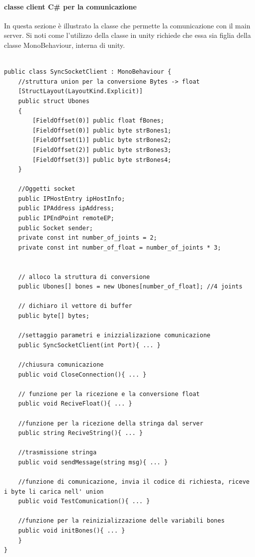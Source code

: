 \documentclass[10pt,a4paper]{article}
\begin{document}
\paragraph{classe client C\# per la comunicazione}
In questa sezione è illustrato la classe che permette la comunicazione con il main server. 
Si noti come l'utilizzo della classe in unity richiede che essa sia figlia della classe MonoBehaviour, interna di unity.
\begin{lstlisting}[style=mycsharp, caption=class client C\#, captionpos=b]

public class SyncSocketClient : MonoBehaviour {
    //struttura union per la conversione Bytes -> float
    [StructLayout(LayoutKind.Explicit)]
    public struct Ubones
    {
        [FieldOffset(0)] public float fBones;
        [FieldOffset(0)] public byte strBones1;
        [FieldOffset(1)] public byte strBones2;
        [FieldOffset(2)] public byte strBones3;
        [FieldOffset(3)] public byte strBones4;
    }

    //Oggetti socket 
    public IPHostEntry ipHostInfo;
    public IPAddress ipAddress;
    public IPEndPoint remoteEP;
    public Socket sender;
    private const int number_of_joints = 2;
    private const int number_of_float = number_of_joints * 3;


    // alloco la struttura di conversione
    public Ubones[] bones = new Ubones[number_of_float]; //4 joints

    // dichiaro il vettore di buffer
    public byte[] bytes;

    //settaggio parametri e inizzializazione comunicazione
    public SyncSocketClient(int Port){ ... }

    //chiusura comunicazione
    public void CloseConnection(){ ... }

    // funzione per la ricezione e la conversione float
    public void ReciveFloat(){ ... }
	
	//funzione per la ricezione della stringa dal server
    public string ReciveString(){ ... }

    //trasmissione stringa
    public void sendMessage(string msg){ ... }

    //funzione di comunicazione, invia il codice di richiesta, riceve i byte li carica nell' union 
    public void TestComunication(){ ... }
	
	//funzione per la reinizializzazione delle variabili bones
    public void initBones(){ ... }
    }
}
\end{lstlisting}
\end{document}
